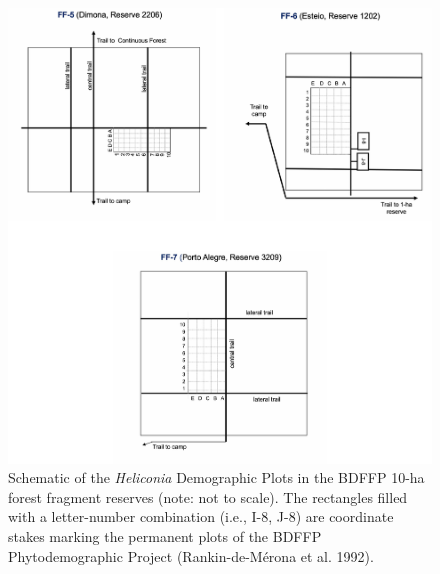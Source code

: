 \documentclass[
  man, donotrepeattitle,floatsintext]{apa6}
\begin{document}
\newpage
\begin{figure}[h]

{\centering \includegraphics{Bruna_etal_MetadataS1_files/figure-latex/plotsten-1} 

}

\caption{Schematic of the \textit{Heliconia} Demographic Plots in the BDFFP 10-ha forest fragment reserves (note: not to scale). The rectangles filled with a letter-number combination (i.e., I-8, J-8) are coordinate stakes marking the permanent plots of the BDFFP Phytodemographic Project (Rankin-de-Mérona et al. 1992).}\label{fig:plotsten}
\end{figure}

\newpage
\end{document}
